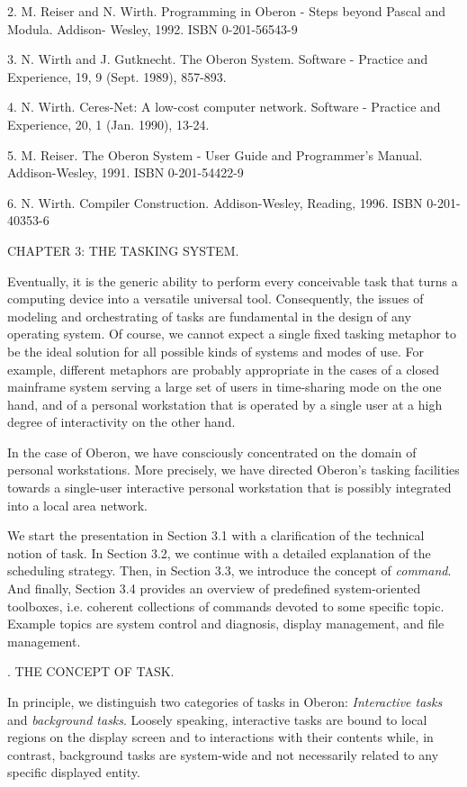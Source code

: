 2. M. Reiser and N. Wirth. Programming in Oberon - Steps beyond Pascal and Modula. Addison- Wesley, 1992. ISBN 0-201-56543-9

3. N. Wirth and J. Gutknecht. The Oberon System. Software - Practice and Experience, 19, 9 (Sept. 1989), 857-893.

4. N. Wirth. Ceres-Net: A low-cost computer network. Software - Practice and Experience, 20, 1 (Jan. 1990), 13-24.

5. M. Reiser. The Oberon System - User Guide and Programmer's Manual. Addison-Wesley, 1991. ISBN 0-201-54422-9

6. N. Wirth. Compiler Construction. Addison-Wesley, Reading, 1996. ISBN 0-201-40353-6

\beginchapter CHAPTER 3: THE TASKING SYSTEM.

Eventually, it is the generic ability to perform every conceivable
task that turns a computing device into a versatile universal
tool. Consequently, the issues of modeling and orchestrating of tasks
are fundamental in the design of any operating system. Of course, we
cannot expect a single fixed tasking metaphor to be the ideal solution
for all possible kinds of systems and modes of use. For example,
different metaphors are probably appropriate in the cases of a closed
mainframe system serving a large set of users in time-sharing mode on
the one hand, and of a personal workstation that is operated by a
single user at a high degree of interactivity on the other hand.

In the case of Oberon, we have consciously concentrated on the domain
of personal workstations. More precisely, we have directed Oberon's
tasking facilities towards a single-user interactive personal
workstation that is possibly integrated into a local area network.

We start the presentation in Section 3.1 with a clarification of the
technical notion of task. In Section 3.2, we continue with a detailed
explanation of the scheduling strategy. Then, in Section 3.3, we
introduce the concept of \emph{command}. And finally, Section 3.4 provides an
overview of predefined system-oriented toolboxes, i.e. coherent
collections of commands devoted to some specific topic. Example topics
are system control and diagnosis, display management, and file
management.

. THE CONCEPT OF TASK.

In principle, we distinguish two categories of tasks in Oberon: \emph{Interactive tasks} and \emph{background tasks}. Loosely speaking,
interactive tasks are bound to local regions on the display screen and
to interactions with their contents while, in contrast, background
tasks are system-wide and not necessarily related to any specific
displayed entity.


